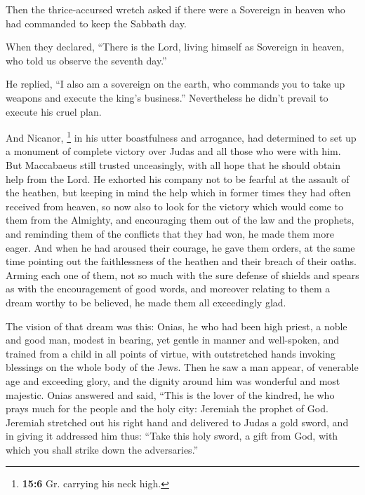  Then the thrice-accursed wretch asked if there were a
Sovereign in heaven who had commanded to keep the Sabbath day.

 When they declared, ``There is the Lord, living himself
as Sovereign in heaven, who told us observe the seventh day.''

 He replied, ``I also am a sovereign on the earth, who
commands you to take up weapons and execute the king's business.''
Nevertheless he didn't prevail to execute his cruel plan.

 And Nicanor, \footnote{\textbf{15:6} Gr. carrying his
  neck high.} in his utter boastfulness and arrogance, had determined to
set up a monument of complete victory over Judas and all those who were
with him.  But Maccabaeus still trusted unceasingly, with
all hope that he should obtain help from the Lord.  He
exhorted his company not to be fearful at the assault of the heathen,
but keeping in mind the help which in former times they had often
received from heaven, so now also to look for the victory which would
come to them from the Almighty,  and encouraging them out
of the law and the prophets, and reminding them of the conflicts that
they had won, he made them more eager.  And when he had
aroused their courage, he gave them orders, at the same time pointing
out the faithlessness of the heathen and their breach of their oaths.
 Arming each one of them, not so much with the sure
defense of shields and spears as with the encouragement of good words,
and moreover relating to them a dream worthy to be believed, he made
them all exceedingly glad.

 The vision of that dream was this: Onias, he who had
been high priest, a noble and good man, modest in bearing, yet gentle in
manner and well-spoken, and trained from a child in all points of
virtue, with outstretched hands invoking blessings on the whole body of
the Jews.  Then he saw a man appear, of venerable age and
exceeding glory, and the dignity around him was wonderful and most
majestic.  Onias answered and said, ``This is the lover
of the kindred, he who prays much for the people and the holy city:
Jeremiah the prophet of God.  Jeremiah stretched out his
right hand and delivered to Judas a gold sword, and in giving it
addressed him thus:  ``Take this holy sword, a gift from
God, with which you shall strike down the adversaries.''


